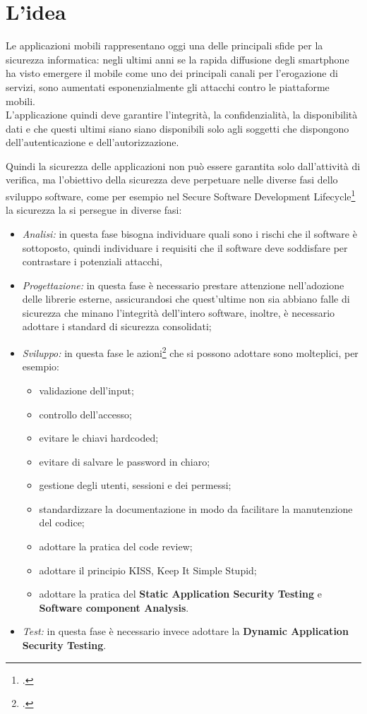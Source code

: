 \section{L'idea}\label{sec:l'idea}

Le applicazioni mobili rappresentano oggi una delle principali sfide per la sicurezza informatica: negli ultimi anni se la rapida diffusione degli smartphone ha visto emergere il mobile come uno dei principali canali per l'erogazione di servizi, sono aumentati esponenzialmente gli attacchi contro le piattaforme mobili.\\
L'applicazione quindi deve garantire l'integrità, la confidenzialità, la disponibilità dati e che questi ultimi siano siano disponibili solo agli soggetti che dispongono dell'autenticazione e dell'autorizzazione.

Quindi la sicurezza delle applicazioni non può essere garantita solo dall'attività di verifica, ma l'obiettivo della sicurezza deve perpetuare nelle diverse fasi dello sviluppo software, come per esempio nel Secure Software Development Lifecycle\footcite{site:ssdl} la sicurezza la si persegue in diverse fasi:
\begin{itemize}
    \item \textit{Analisi:} in questa fase bisogna individuare quali sono i rischi che il software è sottoposto, quindi individuare i requisiti che il software deve soddisfare per contrastare i potenziali attacchi,
    \item \textit{Progettazione:} in questa fase è necessario prestare attenzione nell'adozione delle librerie esterne, assicurandosi che quest'ultime non sia abbiano falle di sicurezza che minano l'integrità dell'intero software, inoltre, è necessario adottare i standard di sicurezza consolidati;
    \item \textit{Sviluppo:} in questa fase le azioni\footcite{site:security-best-practice} che si possono adottare sono molteplici, per esempio:
    \begin{itemize}
        \item validazione dell'input;
        \item controllo dell'accesso;
        \item evitare le chiavi hardcoded;
        \item evitare di salvare le password in chiaro;
        \item gestione degli utenti, sessioni e dei permessi;
        \item standardizzare la documentazione in modo da facilitare la manutenzione del codice;
        \item adottare la pratica del code review;
        \item adottare il principio KISS, Keep It Simple Stupid;
        \item adottare la pratica del \textbf{Static Application Security Testing} e \textbf{Software component Analysis}.
    \end{itemize}
    \item \textit{Test:} in questa fase è necessario invece adottare la \textbf{Dynamic Application Security Testing}.
\end{itemize}

